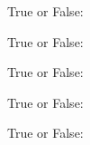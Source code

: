 \documentclass[nooutcomes,noauthor]{ximera}
\author{Bart Snapp}
\begin{document}
\maketitle



\begin{exercise}
  True or False: 
 
\end{exercise}




\begin{exercise}
  True or False: 
\end{exercise}




\begin{exercise}
  True or False:
\end{exercise}



\begin{exercise}
  True or False: 
\end{exercise}




\begin{exercise}
  True or False: 
\end{exercise}



\end{document}
